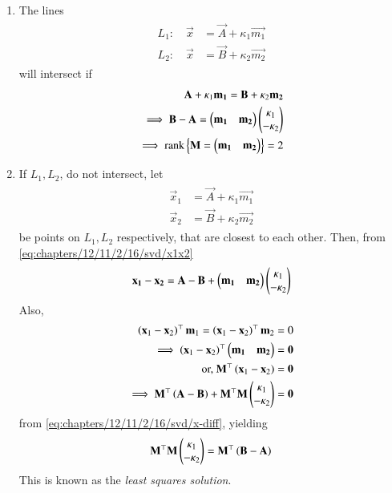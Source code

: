 \begin{enumerate}[label=\thesubsection.\arabic*.,ref=\thesubsection.\theenumi]
	\item The lines
\begin{align}
\begin{split}
	L_1: \quad   \vec{x} &=\vec{A}+ \kappa_1\vec{m_1}
	\\
L_2: \quad        
	\vec{x} &= \vec{B}  + \kappa_2\vec{m_2} 
\end{split}
	    \label{eq:chapters/12/11/2/16/svd/L1L2}
\end{align}
will intersect if 
\begin{align}
\mathbf{A}+ \kappa_1\mathbf{m_1}
= \mathbf{B}  + \kappa_2\mathbf{m_2} 
\\
\implies 
	 \mathbf{B}-\mathbf{A}=
 \begin{pmatrix}\mathbf{m_1} & \mathbf{m_2}\end{pmatrix}\begin{pmatrix}\kappa_1\\-\kappa_2\end{pmatrix}
 \\
	\implies \text{rank}\left\{\mathbf{M} = 
	\begin{pmatrix}\mathbf{m_1} & \mathbf{m_2}\end{pmatrix}\right\} = 2
\end{align}
\item If $L_1, L_2$, do not intersect, let 
\begin{align}
\begin{split}
	\vec{x}_1 &=\vec{A}+ \kappa_1\vec{m_1}
	\\
	\vec{x}_2 &= \vec{B}  + \kappa_2\vec{m_2} 
\end{split}
	    \label{eq:chapters/12/11/2/16/svd/x1x2}
\end{align}
be points on 
$L_1, L_2$ respectively, that are closest to each other.
Then, 
	    from \eqref{eq:chapters/12/11/2/16/svd/x1x2}
\begin{align}
\mathbf{x_1} - \mathbf{x_2} =
	 \mathbf{A}-\mathbf{B}+
 \begin{pmatrix}\mathbf{m_1} & \mathbf{m_2}\end{pmatrix}\begin{pmatrix}\kappa_1\\-\kappa_2\end{pmatrix}
	\label{eq:chapters/12/11/2/16/svd/x-diff}
\end{align}
Also, 
    \begin{align}
	    \left(\mathbf{x}_1 -\mathbf{x}_2\right)^\top\mathbf{m}_1
	    =
	    \left(\mathbf{x}_1 -\mathbf{x}_2\right)^\top\mathbf{m}_2
	    =0
	    \\
	    \implies 
	    \left(\mathbf{x}_1 -\mathbf{x}_2\right)^\top\begin{pmatrix}\mathbf{m_1} & \mathbf{m_2}\end{pmatrix} = \mathbf{0}
	    \\
	    \text{or, }	    \mathbf{M}^\top\left(\mathbf{x}_1 -\mathbf{x}_2\right) = \mathbf{0}
	    \\
	    \implies \mathbf{M}^\top
	    \left(\mathbf{A}-\mathbf{B}\right)+
 \mathbf{M}^\top\mathbf{M}\begin{pmatrix}\kappa_1\\-\kappa_2\end{pmatrix} = \mathbf{0}
	    \label{eq:chapters/12/11/2/16/svd/m-orth}
    \end{align}
	    from 
	\eqref{eq:chapters/12/11/2/16/svd/x-diff},
	yielding
    \begin{align}
	    \mathbf{M}^\top\mathbf{M}\begin{pmatrix}\kappa_1\\-\kappa_2\end{pmatrix} = \mathbf{M}^\top\left(\mathbf{B}-\mathbf{A}\right)
        \label{eq:chapters/12/11/2/16/svd/vec-eqn}
    \end{align}
    This is known as the {\em least squares solution}.
\end{enumerate}
